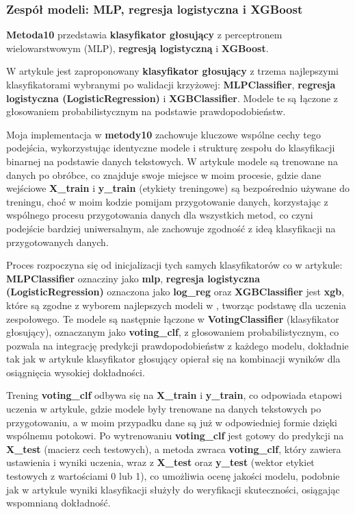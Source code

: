 \subsubsection{Zespół modeli: MLP, regresja logistyczna i XGBoost}
\textbf{Metoda10} przedstawia \textbf{klasyfikator głosujący} z perceptronem wielowarstwowym (MLP), \textbf{regresją logistyczną} i \textbf{XGBoost}.

W artykule \cite{metoda10} jest zaproponowany \textbf{klasyfikator głosujący} z trzema najlepszymi klasyfikatorami wybranymi po walidacji krzyżowej: \textbf{MLPClassifier}, \textbf{regresja logistyczna (LogisticRegression)} i \textbf{XGBClassifier}. Modele te są łączone z głosowaniem probabilistycznym na podstawie prawdopodobieństw.

Moja implementacja w \textbf{metody10} zachowuje kluczowe wspólne cechy tego podejścia, wykorzystując identyczne modele i strukturę zespołu do klasyfikacji binarnej na podstawie danych tekstowych. W artykule modele są trenowane na danych po obróbce, co znajduje swoje miejsce w moim procesie, gdzie dane wejściowe \textbf{X\_train} i \textbf{y\_train} (etykiety treningowe) są bezpośrednio używane do treningu, choć w moim kodzie pomijam przygotowanie danych, korzystając z wspólnego procesu przygotowania danych dla wszystkich metod, co czyni podejście bardziej uniwersalnym, ale zachowuje zgodność z ideą klasyfikacji na przygotowanych danych.

Proces rozpoczyna się od inicjalizacji tych samych klasyfikatorów co w artykule: \textbf{MLPClassifier} oznacziny jako \textbf{mlp}, \textbf{regresja logistyczna (LogisticRegression)} oznaczona jako \newline\textbf{log\_reg} oraz \textbf{XGBClassifier} jest \textbf{xgb}, które są zgodne z wyborem najlepszych modeli w \cite{metoda10}, tworząc podstawę dla uczenia zespołowego. Te modele są następnie łączone w \textbf{VotingClassifier} (klasyfikator głosujący), oznaczanym jako \textbf{voting\_clf}, z głosowaniem probabilistycznym, co pozwala na integrację predykcji prawdopodobieństw z każdego modelu, dokładnie tak jak w artykule klasyfikator głosujący opierał się na kombinacji wyników dla osiągnięcia wysokiej dokładności.

Trening \textbf{voting\_clf} odbywa się na \textbf{X\_train} i \textbf{y\_train}, co odpowiada etapowi uczenia w artykule, gdzie modele były trenowane na danych tekstowych po przygotowaniu, a w moim przypadku dane są już w odpowiedniej formie dzięki wspólnemu potokowi. Po wytrenowaniu \textbf{voting\_clf} jest gotowy do predykcji na \textbf{X\_test} (macierz cech testowych), a metoda zwraca \textbf{voting\_clf}, który zawiera ustawienia i wyniki uczenia, wraz z \textbf{X\_test} oraz \textbf{y\_test} (wektor etykiet testowych z wartościami 0 lub 1), co umożliwia ocenę jakości modelu, podobnie jak w artykule wyniki klasyfikacji służyły do weryfikacji skuteczności, osiągając wspomnianą dokładność.

